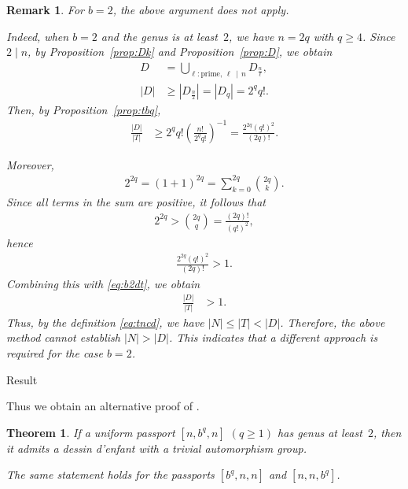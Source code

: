 \documentclass[12pt,reqno]{amsart}
\makeatletter
\newif\if@noindentafterheading
\renewcommand\subsection{\@startsection{subsection}{2}{\z@}%
  {-2.5ex \@plus -.3ex \@minus -.2ex}%
  {1.5ex \@plus .2ex}%
  {\normalfont\bfseries}%
}
\let\orig@subsection\subsection
\renewcommand\subsection{%
  \@ifstar{\subsection@star}{\subsection@nostar}%
}
\newcommand\subsection@nostar{%
  \@ifnextchar[{\subsection@opt}{\subsection@noopt}%
}
\newcommand\subsection@opt[2][]{%
  \global\@noindentafterheadingtrue
  \orig@subsection[#1]{#2}%
  \global\@noindentafterheadingfalse
}
\newcommand\subsection@noopt[1]{%
  \global\@noindentafterheadingtrue
  \orig@subsection{#1}%
  \global\@noindentafterheadingfalse
}
\newcommand\subsection@star[1]{%
  \global\@noindentafterheadingtrue
  \orig@subsection*{#1}%
  \global\@noindentafterheadingfalse
}
\newcommand{\f}[2]{\frac{#1}{#2}}							%
\newcommand{\vt}[1]{\left\lvert #1 \right\rvert}					%
\theoremstyle{mythmstyle}
\newtheorem{thm}[lemma]{Theorem}
\theoremstyle{mydefstyle}
\newtheorem{rem}[lemma]{Remark}
\newcommand{\propref}[1]{Proposition~\ref{#1}}
\newcommand{\dde}{dessin d'enfant\xspace}
\numberwithin{equation}{section}
\makeatother
\begin{document}
\begin{rem}
For $b=2$, the above argument does not apply.

Indeed, when $b=2$ and the genus is at least~$2$, we have $n = 2q$ with $q \ge 4$.
Since $2 \mid n$, by \propref{prop:Dk} and \propref{prop:D}, we obtain
\begin{align}
D &= \bigcup_{\ell\colon \text{prime},\, \ell\, \mid\, n} D_{\f{n}{\ell}}, \\
\vt{D} &\ge \vt{D_{\f{n}{2}}} = \vt{D_{q}} = 2^{q}q!.
\end{align}
Then, by \propref{prop:tbq},
\begin{align}
\label{eq:b2dt}
\f{\vt{D}}{\vt{T}} &\ge 2^{q}q!\left(\f{n!}{2^{q}q!}\right)^{-1} = \f{2^{2q}(q!)^{2}}{(2q)!}.
\end{align}

Moreover,
\begin{align}
2^{2q} = (1+1)^{2q} = \sum_{k=0}^{2q}\binom{2q}{k}.
\end{align}
Since all terms in the sum are positive, it follows that
\begin{align}
2^{2q} > \binom{2q}{q} = \f{(2q)!}{(q!)^{2}},
\end{align}
hence
\begin{align}
\f{2^{2q}(q!)^{2}}{(2q)!} > 1.
\end{align}
Combining this with \eqref{eq:b2dt}, we obtain
\begin{align}
\f{\vt{D}}{\vt{T}} & > 1.
\end{align}
Thus, by the definition \eqref{eq:tncd}, we have $\vt{N} \le \vt{T} < \vt{D}$.
Therefore, the above method cannot establish $\vt{N} > \vt{D}$.
This indicates that a different approach is required for the case $b=2$.
\end{rem}

\subsection{Result}

Thus we obtain an alternative proof of \cite[Theorem~7.6]{Ohnishi26}.

\begin{thm}\cite[Theorem~7.6]{Ohnishi26}
\label{thm:class2}
If a uniform passport $[n, b^{q}, n]$ $(q \ge 1)$ has genus at least~$2$, then it admits a \dde with a trivial automorphism group.

The same statement holds for the passports $[b^{q}, n, n]$ and $[n, n, b^{q}]$.
\end{thm}
\end{document}
